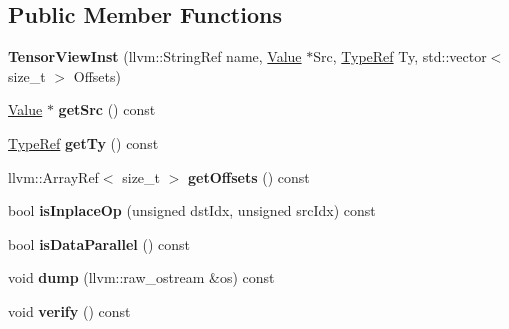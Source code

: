 \subsection*{Public Member Functions}
\begin{DoxyCompactItemize}
\item 
\mbox{\label{classglow_1_1_tensor_view_inst_a2381cf2d8b78d4ab452f3e2422384809}} 
{\bfseries Tensor\+View\+Inst} (llvm\+::\+String\+Ref name, \hyperlink{classglow_1_1_value}{Value} $\ast$Src, \hyperlink{structglow_1_1_type}{Type\+Ref} Ty, std\+::vector$<$ size\+\_\+t $>$ Offsets)
\item 
\mbox{\label{classglow_1_1_tensor_view_inst_a94686ffc00a8912ba38e2ecf4568d577}} 
\hyperlink{classglow_1_1_value}{Value} $\ast$ {\bfseries get\+Src} () const
\item 
\mbox{\label{classglow_1_1_tensor_view_inst_ab2949653409f8a7b777acc80c3b25a0e}} 
\hyperlink{structglow_1_1_type}{Type\+Ref} {\bfseries get\+Ty} () const
\item 
\mbox{\label{classglow_1_1_tensor_view_inst_ade682d30e2ddeaec32052c33a97d81f8}} 
llvm\+::\+Array\+Ref$<$ size\+\_\+t $>$ {\bfseries get\+Offsets} () const
\item 
\mbox{\label{classglow_1_1_tensor_view_inst_a33e31bff5d24d9e7a979ee1842f5f1f7}} 
bool {\bfseries is\+Inplace\+Op} (unsigned dst\+Idx, unsigned src\+Idx) const
\item 
\mbox{\label{classglow_1_1_tensor_view_inst_a2fac53ecf3eeb1a46dce285a3c6ed125}} 
bool {\bfseries is\+Data\+Parallel} () const
\item 
\mbox{\label{classglow_1_1_tensor_view_inst_a0da1ff00f1cce159139b721d975b6283}} 
void {\bfseries dump} (llvm\+::raw\+\_\+ostream \&os) const
\item 
\mbox{\label{classglow_1_1_tensor_view_inst_a8f2b67c2fbfde0aa15b10ea3068aa275}} 
void {\bfseries verify} () const
\end{DoxyCompactItemize}
